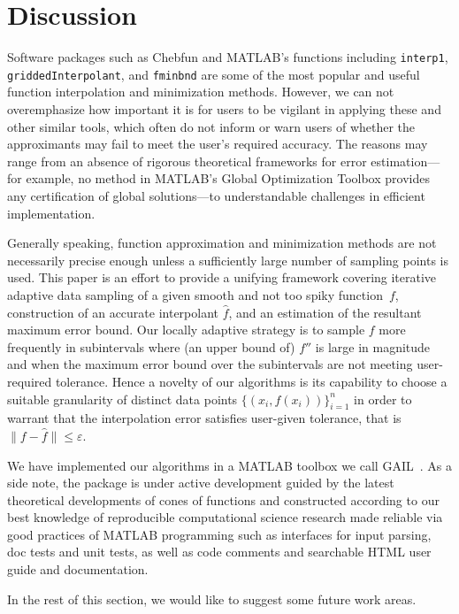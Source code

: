 \documentclass[review]{elsarticle}
\newcommand{\abstol}{\varepsilon}
\theoremstyle{definition}
\begin{document}
\section{Discussion}

Software packages such as Chebfun and MATLAB's functions including
\texttt{interp1}, \texttt{griddedInterpolant}, and \texttt{fminbnd} are some of
the most popular and useful function interpolation and minimization methods.
However, we can not overemphasize how important it is for users to be vigilant
in applying these and other similar tools, which often do not inform or warn
users of whether the approximants may fail to meet the user's required accuracy.
The reasons may range from an absence of rigorous theoretical frameworks for
error estimation---for example, no method in MATLAB's Global Optimization
Toolbox provides any certification of global solutions---to understandable
challenges in efficient implementation.

Generally speaking, function approximation and minimization methods are not
necessarily precise enough unless a sufficiently large number of sampling points
is used. This paper is an effort to provide a unifying framework covering
iterative adaptive data sampling of a given smooth and not too spiky
function~$f$, construction of an accurate interpolant $\hat{f}$, and an
estimation of the resultant maximum error bound. Our locally adaptive strategy
is to sample $f$ more frequently in subintervals where (an upper bound of) $f''$
is large in magnitude and when the maximum error bound over the subintervals are
not meeting user-required tolerance. Hence a novelty of our algorithms is its
capability to choose a suitable granularity of distinct data points $\{(x_i,
f(x_i))\}_{i=1}^n$ in order to warrant that the interpolation error satisfies
user-given tolerance, that is $\| f - \hat{f} \| \le \abstol$.

We have implemented our algorithms in a MATLAB toolbox we call
GAIL~\cite{ChoEtal15a}. As a side note, the package is under active development
guided by the latest theoretical developments of cones of functions and
constructed according to our best knowledge of reproducible computational
science research made reliable via good practices of MATLAB programming such as
interfaces for input parsing, doc tests and unit tests, as well as code
comments and searchable HTML user guide and documentation.

In the rest of this section, we would like to suggest some future work areas.
\end{document}

